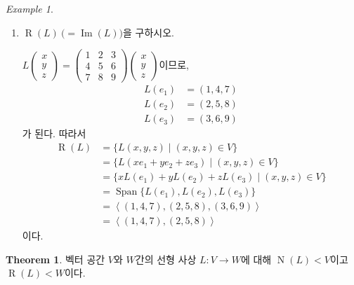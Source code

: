 \documentclass[unfonts,oneside,a4paper]{oblivoir}
\theoremstyle{definition}
\theoremstyle{theorem}
\newtheorem{theorem}{Theorem}
\theoremstyle{remark}
\theoremstyle{remark}
\theoremstyle{remark}
\newtheorem*{example}{Example}
\theoremstyle{remark}
\renewcommand{\vec}[1]{\bm{\mathit{#1}}}
\DeclareMathOperator{\Span}{Span}
\DeclareMathOperator{\Null}{N}
\DeclareMathOperator{\Image}{Im}
\DeclareMathOperator{\Range}{R}
\begin{document}
\begin{example}
\begin{enumerate}
    \item $\Range (L)\ \bigl(= \Image(L)\bigr)$을 구하시오.
        \begin{solution}
            $L \begin{pmatrix}
                x \\ y \\ z
                \end{pmatrix} = \begin{pmatrix}
                1 & 2 & 3 \\ 4 & 5 & 6 \\ 7 & 8 & 9
                \end{pmatrix} \begin{pmatrix}
                x \\ y \\ z
            \end{pmatrix}$이므로,
            \begin{align*}
                L(\vec e_1) &= (1, 4, 7)\\
                L(\vec e_2) &= (2, 5, 8)\\
                L(\vec e_3) &= (3, 6, 9)
            \end{align*}
            가 된다.
            따라서
            \begin{align*}
                \Range (L) &= \{L(x, y, z) \mid (x, y, z) \in V\}\\
                           &= \{L(x \vec e_1 + y \vec e_2 + z \vec e_3) \mid (x, y, z) \in V\}\\
                           &= \{x L(\vec e_1) + y L(\vec e_2) + z L(\vec e_3) \mid (x, y, z) \in V\}\\
                           &= \Span \{L(\vec e_1), L(\vec e_2), L(\vec e_3)\}\\
                           &= \left<(1, 4, 7), (2, 5, 8), (3, 6, 9)\right>\\
                           &= \left<(1, 4, 7), (2, 5, 8)\right>
            \end{align*}
            이다.
        \end{solution}
\end{enumerate}
\end{example}

\begin{theorem} \label{thm7}
    벡터 공간 $V$와 $W$간의 선형 사상 $L: V \rightarrow W$에 대해 $\Null (L) < V$이고 $\Range (L) < W$이다.
\end{theorem}
\end{document}

